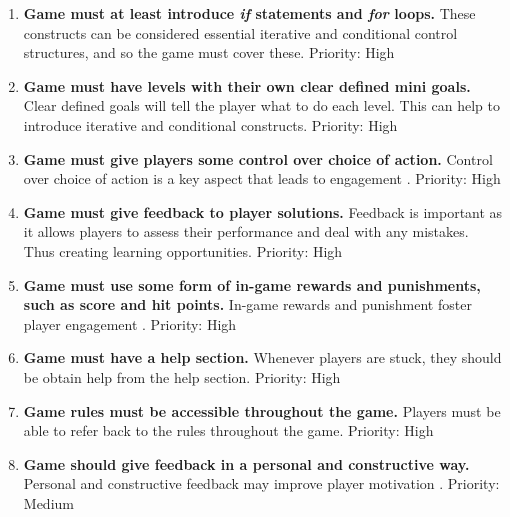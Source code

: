 \documentclass[a4paper,11.5pt]{report}
\numberwithin{figure}{section}
\numberwithin{table}{section}
\numberwithin{equation}{section}
\numberwithin{equation}{section}
\begin{document}
\begin{enumerate}[label=3.2.\arabic*]

  \item \textbf{Game must at least introduce \textit{if} statements and \textit{for} loops.} These constructs can be considered essential iterative and conditional control structures, and so the game must cover these. \newline Priority: High
  
  \item \textbf{Game must have levels with their own clear defined mini goals.} Clear defined goals will tell the player what to do each level. This can help to introduce iterative and conditional constructs. \newline Priority: High
  
  \item \textbf{Game must give players some control over choice of action.} Control over choice of action is a key aspect that leads to engagement \citep{whitton2011}. \newline Priority: High

  \item \textbf{Game must give feedback to player solutions.} Feedback is important as it allows players to assess their performance and deal with any mistakes. Thus creating learning opportunities. \newline Priority: High
  
  \item \textbf{Game must use some form of in-game rewards and punishments, such as score and hit points.} In-game rewards and punishment foster player engagement \citep{roungas2015}. \newline Priority: High
  
  \item \textbf{Game must have a help section.} Whenever players are stuck, they should be obtain help from the help section. \newline Priority: High
  
  \item \textbf{Game rules must be accessible throughout the game.} Players must be able to refer back to the rules throughout the game. \newline Priority: High
  
  \item \textbf{Game should give feedback in a personal and constructive way.} Personal and constructive feedback may improve player motivation \citep{lee2011}. \newline Priority: Medium
  

\end{enumerate}
\end{document}
